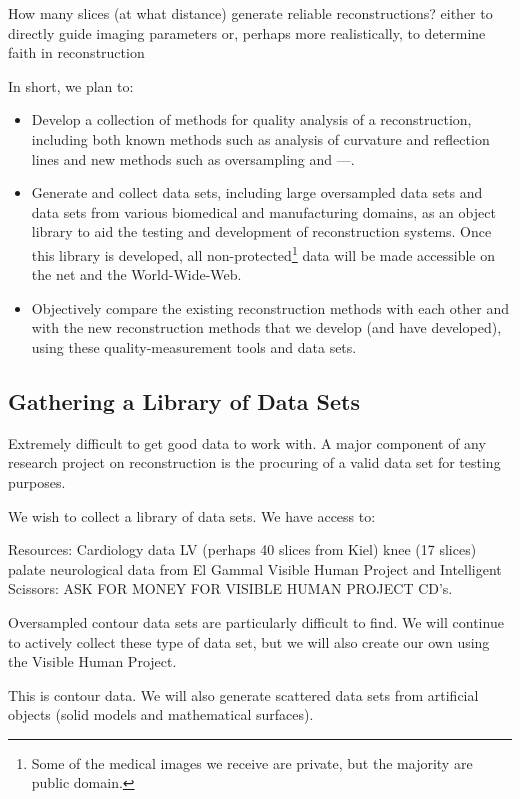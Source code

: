 How many slices (at what distance) generate reliable reconstructions?
either to directly guide imaging parameters or, 
perhaps more realistically, to determine faith in reconstruction


In short, we plan to:
\begin{itemize}
\item Develop a collection of methods for quality analysis of a reconstruction,
	including both known methods such as analysis of curvature and reflection 
	lines and new methods such as oversampling and ---.
\item Generate and collect data sets, including large oversampled data sets 
	and data sets from various biomedical and manufacturing domains,
	as an object library to aid the testing and development 
	of reconstruction systems.
	Once this library is developed, all non-protected\footnote{Some of the
	medical images we receive are private, but the majority are
	public domain.}
	data will be made accessible on the net and the World-Wide-Web.
\item Objectively compare the existing reconstruction methods with each
	other and with the new reconstruction methods that we develop 
	(and have developed), 
	using these quality-measurement tools and data sets.
\end{itemize}


\subsection{Gathering a Library of Data Sets}
\label{sec-library}

Extremely difficult to get good data to work with.
A major component of any research project on reconstruction
is the procuring of a valid data set for testing purposes.

We wish to collect a library of data sets.
We have access to:

Resources:
Cardiology data
LV (perhaps 40 slices from Kiel)
knee (17 slices)
palate
neurological data from El Gammal
Visible Human Project and Intelligent Scissors: ASK FOR MONEY FOR 
VISIBLE HUMAN PROJECT CD's.

Oversampled contour data sets are particularly difficult to find.
We will continue to actively collect these type of data set,
but we will also create our own using the Visible Human Project.

This is contour data.
We will also generate scattered data sets from artificial objects
(solid models and mathematical surfaces).

